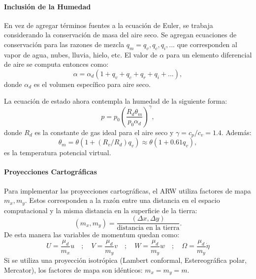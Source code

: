 \paragraph{Inclusión de la Humedad} En vez de agregar términos fuentes a la ecuación de Euler, se trabaja considerando la conservación de masa del aire seco. Se agregan ecuaciones de conservación para las razones de mezcla $q_m=q_v,q_c,q_i,...$ que corresponden al vapor de agua, nubes, lluvia, hielo, etc. El valor de $\alpha$ para un elemento diferencial de aire se computa entonces como:
\begin{equation}
\alpha = \alpha_d(1+q_v+q_c+q_r+q_i+...),
\end{equation}
donde $\alpha_d$ es el volumen específico para aire seco.

La ecuación de estado ahora contempla la humedad de la siguiente forma:
\begin{equation}\label{eq:04_gasideal}
p = p_0\left(\frac{R_d \theta_m}{p_0 \alpha_d}\right)^\gamma,
\end{equation}
donde $R_d$ es la constante de gas ideal para el aire seco y $\gamma = c_p/c_v = 1.4$. Además:
\begin{equation}
\theta_m = \theta(1+(R_v/R_d)q_v)\approx\theta(1+0.61q_v),
\end{equation}
es la temperatura potencial virtual.
\paragraph{Proyecciones Cartográficas} Para implementar las proyecciones cartográficas, el ARW utiliza factores de mapa $m_x,m_y$. Estos corresponden a la razón entre una distancia en el espacio computacional y la misma distancia en la superficie de la tierra:
\begin{equation}
(m_x,m_y) = \frac{(\Delta x, \Delta y)}{\text{distancia en la tierra}}.
\end{equation}
De esta manera las variables de momentum quedan como:
\begin{equation}
U = \frac{\mu_d}{m_x}u\quad;\quad V = \frac{\mu_d}{m_y}v\quad;\quad W = \frac{\mu_d}{m_y}w\quad;\quad \Omega = \frac{\mu_d}{m_y}\dot{\eta}
\end{equation}
Si se utiliza una proyección isotrópica (Lambert conformal, Estereográfica polar, Mercator), los factores de mapa son idénticos: $m_x=m_y = m$.
